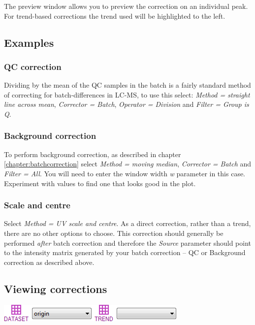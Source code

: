 \documentclass[11pt,a4paper]{article}
\newcommand{\menu}[1]{ \flqq\textit{#1}\frqq}
\begin{document}
The preview window allows you to preview the correction on an individual peak. For trend-based corrections the trend used will be highlighted to the left.

\subsection{Examples}

\subsubsection{QC correction}
Dividing by the mean of the QC samples in the batch is a fairly standard method of correcting for batch-differences in LC-MS, to use this select: \menu{Method = straight line across mean}, \menu{Corrector = Batch}, \menu{Operator = Division} and \menu{Filter = Group is Q}. 

\subsubsection{Background correction}
To perform background correction, as described in chapter \ref{chapter:batchcorrection} select \menu{Method = moving median}, \menu{Corrector = Batch} and \menu{Filter = All}. You will need to enter the window width \menu{w} parameter in this case. Experiment with values to find one that looks good in the plot.

\subsubsection{Scale and centre}
Select \menu{Method = UV scale and centre}. As a direct correction, rather than a trend, there are no other options to choose. This correction should generally be performed \textit{after} batch correction and therefore the \menu{Source} parameter should point to the intensity matrix generated by your batch correction -- QC or Background correction as described above.

\subsection{Viewing corrections}
\begin{center}
	\includegraphics[max width=0.7\linewidth]{Images/userguide/dataset}
\end{center}
\end{document}
